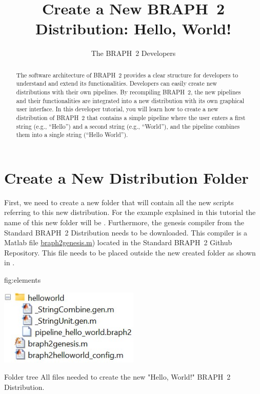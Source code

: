 \documentclass{tufte-handout}
\title{Create a New BRAPH~2 Distribution: Hello, World! }
\author[The BRAPH~2 Developers]{The BRAPH~2 Developers}
\begin{document}
\maketitle

\begin{abstract}
\noindent
The software architecture of BRAPH~2 provides a clear structure for developers to understand and extend its functionalities. 
Developers can easily create new distributions with their own pipelines. 
By recompiling BRAPH~2, the new pipelines and their functionalities are integrated into a new distribution with its own graphical user interface.
In this developer tutorial, you will learn how to create a new distribution of BRAPH~2 that contains a simple pipeline where the user enters a first string (e.g., “Hello”) and a second string (e.g., “World”), and the pipeline combines them into a single string (“Hello World”).
\end{abstract}

\tableofcontents

\clearpage
\section{Create a New Distribution Folder}

First, we need to create a new folder that will contain all the new scripts referring to this new distribution. For the example explained in this tutorial the name of this new folder will be . Furthermore, the genesis compiler from the Standard BRAPH~2 Distribution needs to be downloaded. This compiler is a Matlab file \href{https://github.com/braph-software/BRAPH-2/tree/develop/braph2genesis/braph2genesis.m}{braph2genesis.m})  located in the Standard BRAPH~2 Github Repository. This file needs to be placed outside the new created folder  as shown in .

{fig:elements}
{\centerline{\includegraphics[width=0.5\textwidth]{fig01.jpg}}}
{Folder tree}
{
	All files needed to create the new "Hello, World!" BRAPH~2 Distribution.
}

\end{document}

